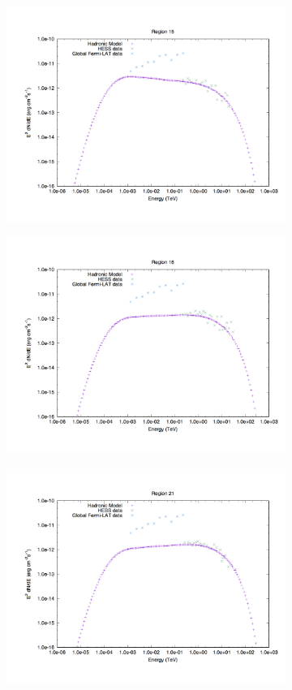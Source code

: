 \documentclass[12pt,a4paper]{article}
\begin{document}
\begin{figure}[H]
	\begin{subfigure}{0.5\textwidth}
		\centering
		\includegraphics[width=0.7\linewidth, height=0.27\textheight, angle=-90]{rxj1713_had15}
		\label{fig:rxj1713lephad5}
	\end{subfigure}
	\begin{subfigure}{0.5\textwidth}
		\centering
		\includegraphics[width=0.7\linewidth, height=0.27\textheight, angle=-90]{rxj1713_had16}
		\label{fig:rxj1713lephad15}
	\end{subfigure}
	\begin{subfigure}{0.5\textwidth}
		\centering
		\includegraphics[width=0.7\linewidth, height=0.27\textheight, angle=-90]{rxj1713_had21}

\end{subfigure}
\end{figure}
\end{document}
